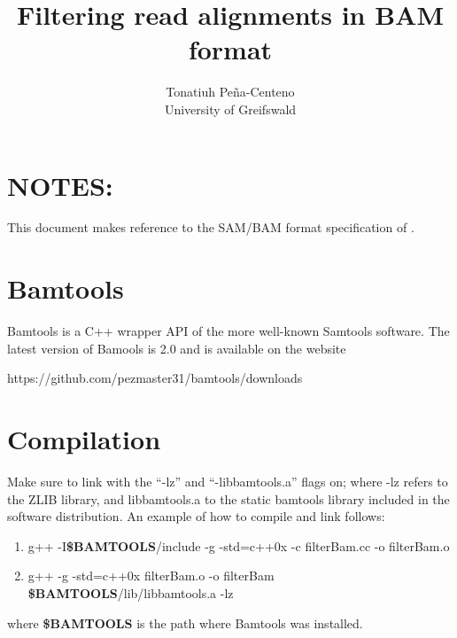 \documentclass[11pt]{article}
\begin{document}
  
\title{Filtering read alignments in BAM format} 
\author{Tonatiuh Pe\~{n}a-Centeno \\
University of Greifswald}
\renewcommand{\today}{15 November, 2011}
\maketitle
{}

\section{NOTES:} 
This document makes reference to the SAM/BAM format specification of \cite{heng09}.

\section{Bamtools}
Bamtools is a C++ wrapper API of the more well-known Samtools software. The latest version of Bamools 
is 2.0 and is available on the website 
	\begin{center}
		https://github.com/pezmaster31/bamtools/downloads
	\end{center}
\item 


\section{Compilation}
Make sure to link with the ``-lz'' and ``-libbamtools.a'' flags on; where -lz refers to the ZLIB library, 
and libbamtools.a to the static bamtools library included in the software distribution. An example of 
how to compile and link follows: \\

\begin{flushleft}
\begin{enumerate}
	\item	g++ -I\textbf{\$BAMTOOLS}/include   -g   -std=c++0x  -c filterBam.cc -o filterBam.o \\
	\item	g++     -g -std=c++0x  filterBam.o -o filterBam \textbf{\$BAMTOOLS}/lib/libbamtools.a -lz  \\
\end{enumerate}
\end{flushleft}
\vphantom{Nothing}
where \textbf{\$BAMTOOLS} is the path where Bamtools was installed.
\end{document}

